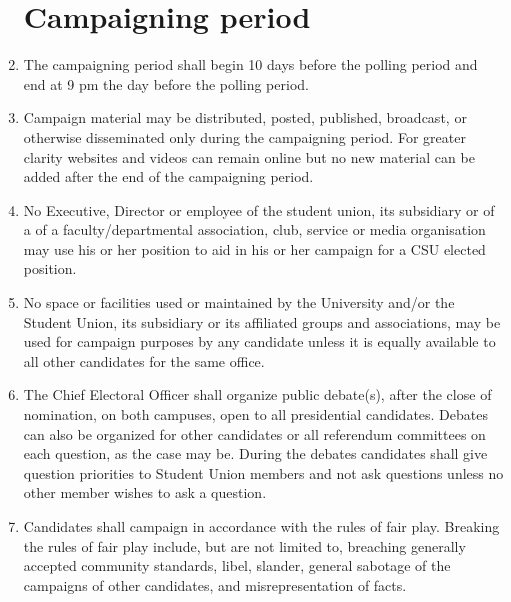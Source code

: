 \documentclass[oneside]{book}
\begin{document}
\begin{enumerate}
\section{\label{Campaigning_period}Campaigning period }
\item The campaigning period shall begin 10 days before the polling period
and end at 9 pm the day before the polling period. 
\item Campaign material may be distributed, posted, published, broadcast,
or otherwise disseminated only during the campaigning period. For
greater clarity websites and videos can remain online but no new material
can be added after the end of the campaigning period. 
\item No Executive, Director or employee of the student union, its subsidiary
or of a of a faculty/departmental association, club, service or media
organisation may use his or her position to aid in his or her campaign
for a CSU elected position. 
\item No space or facilities used or maintained by the University and/or
the Student Union, its subsidiary or its affiliated groups and associations,
may be used for campaign purposes by any candidate unless it is equally
available to all other candidates for the same office. 
\item The Chief Electoral Officer shall organize public debate(s), after
the close of nomination, on both campuses, open to all presidential
candidates. Debates can also be organized for other candidates or
all referendum committees on each question, as the case may be. During
the debates candidates shall give question priorities to Student Union
members and not ask questions unless no other member wishes to ask
a question. 
\item Candidates shall campaign in accordance with the rules of fair play.
Breaking the rules of fair play include, but are not limited to, breaching
generally accepted community standards, libel, slander, general sabotage
of the campaigns of other candidates, and misrepresentation of facts. 


\end{enumerate}
\end{document}
